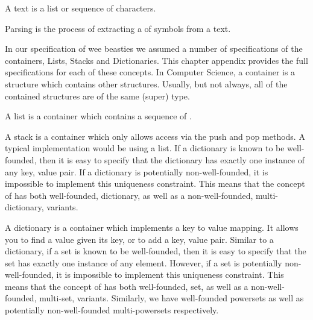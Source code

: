 
\stopDefinition

\subChapterAppendix[title=Texts, reference=textSpec]

A text is a list or sequence of characters.

\subChapterAppendix[title=Parsing, reference=parsingSpec]

Parsing is the process of extracting a  of symbols from 
a text. 

\chapterAppendix[title=Containers]

In our specification of wee beasties we assumed a number of specifications 
of the containers, Lists, Stacks and Dictionaries. This chapter appendix 
provides the full specifications for each of these concepts. In Computer 
Science, a container is a structure which contains other structures. 
Usually, but not always, all of the contained structures are of the same 
(super) type. 

\subChapterAppendix[title=Lists, reference=listSpec]

A list is a container which contains a sequence of \lols.

\subChapterAppendix[title=Stacks, reference=stackSpec]

A stack is a container which only allows access via the push and pop 
methods. A typical implementation would be using a list. If a dictionary 
is known to be well-founded, then it is easy to specify that the 
dictionary has exactly one instance of any key, value pair. If a 
dictionary is potentially non-well-founded, it is impossible to implement 
this uniqueness constraint. This means that the concept of 
 has both well-founded, dictionary, as well as a 
non-well-founded, multi-dictionary, variants. 

\subChapterAppendix[title=Dictionaries, reference=dictionarySpec]

A dictionary is a container which implements a key to value mapping. It 
allows you to find a value given its key, or to add a key, value pair. 
Similar to a dictionary, if a set is known to be well-founded, then it is 
easy to specify that the set has exactly one instance of any element. 
However, if a set is potentially non-well-founded, it is impossible to 
implement this uniqueness constraint. This means that the concept of 
 has both well-founded, set, as well as a non-well-founded, 
multi-set, variants. Similarly, we have well-founded powersets as well as 
potentially non-well-founded multi-powersets respectively. 

\subChapterAppendix[title={Sets and Power Sets}, reference=setSpec]

\stopChapterAppendices
